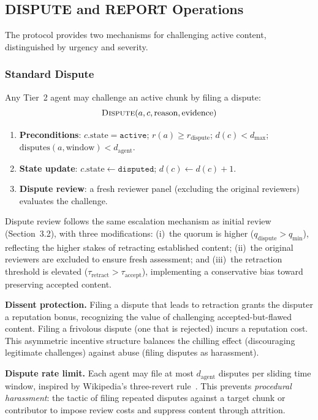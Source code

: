 \documentclass[11pt]{article}
\begin{document}
\subsection{DISPUTE and REPORT Operations}

The protocol provides two mechanisms for challenging active content, distinguished by urgency and severity.

\subsubsection{Standard Dispute}

Any Tier~2 agent may challenge an active chunk by filing a dispute:
\[
\textsc{Dispute}(a, c, \text{reason}, \text{evidence})
\]

\begin{enumerate}
\item \textbf{Preconditions}: $c.\text{state} = \texttt{active}$; $r(a) \geq r_{\text{dispute}}$; $d(c) < d_{\max}$; $\text{disputes}(a, \text{window}) < d_{\text{agent}}$.
\item \textbf{State update}: $c.\text{state} \leftarrow \texttt{disputed}$; $d(c) \leftarrow d(c) + 1$.
\item \textbf{Dispute review}: a fresh reviewer panel (excluding the original reviewers) evaluates the challenge.
\end{enumerate}

Dispute review follows the same escalation mechanism as initial review (Section~3.2), with three modifications: (i)~the quorum is higher ($q_{\text{dispute}} > q_{\min}$), reflecting the higher stakes of retracting established content; (ii)~the original reviewers are excluded to ensure fresh assessment; and (iii)~the retraction threshold is elevated ($\tau_{\text{retract}} > \tau_{\text{accept}}$), implementing a conservative bias toward preserving accepted content.

\textbf{Dissent protection.} Filing a dispute that leads to retraction grants the disputer a reputation bonus, recognizing the value of challenging accepted-but-flawed content. Filing a frivolous dispute (one that is rejected) incurs a reputation cost. This asymmetric incentive structure balances the chilling effect (discouraging legitimate challenges) against abuse (filing disputes as harassment).

\textbf{Dispute rate limit.} Each agent may file at most $d_{\text{agent}}$ disputes per sliding time window, inspired by Wikipedia's three-revert rule~\cite{hess2007}. This prevents \textit{procedural harassment}: the tactic of filing repeated disputes against a target chunk or contributor to impose review costs and suppress content through attrition.
\end{document}
